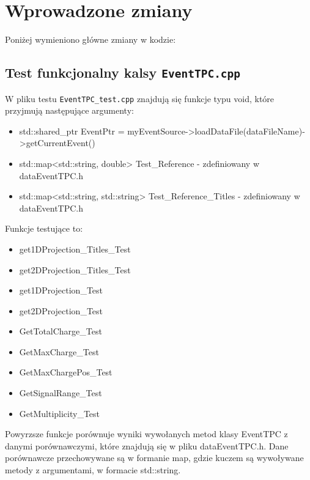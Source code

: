 \documentclass{article}
\begin{document}
\section{Wprowadzone zmiany}
Poniżej wymieniono główne zmiany w kodzie:
\subsection{Test funkcjonalny kalsy \texttt{EventTPC.cpp}}
W pliku testu \texttt{EventTPC\_test.cpp} znajdują się funkcje typu void, które przyjmują następujące argumenty:
\begin{itemize}
    \item
  std::shared\_ptr EventPtr =
  myEventSource-\textgreater loadDataFile(dataFileName)-\textgreater getCurrentEvent()
    \item
  std::map\textless std::string, double\textgreater{} Test\_Reference -
  zdefiniowany w dataEventTPC.h
    \item
  std::map\textless std::string, std::string\textgreater{}
  Test\_Reference\_Titles - zdefiniowany w dataEventTPC.h
    
\end{itemize}
Funkcje testujące to:
\begin{itemize}
    \item get1DProjection\_Titles\_Test 
    \item get2DProjection\_Titles\_Test
    \item get1DProjection\_Test 
    \item get2DProjection\_Test 
    \item GetTotalCharge\_Test 
    \item GetMaxCharge\_Test 
    \item GetMaxChargePos\_Test 
    \item GetSignalRange\_Test 
    \item GetMultiplicity\_Test
\end{itemize}
Powyrzsze funkcje porównuje wyniki wywołanych metod klasy EventTPC z danymi porównawczymi, które znajdują się w pliku dataEventTPC.h. Dane porównawcze przechowywane są w formanie map, gdzie kuczem są wywoływane metody z argumentami, w formacie std::string.
\end{document}
